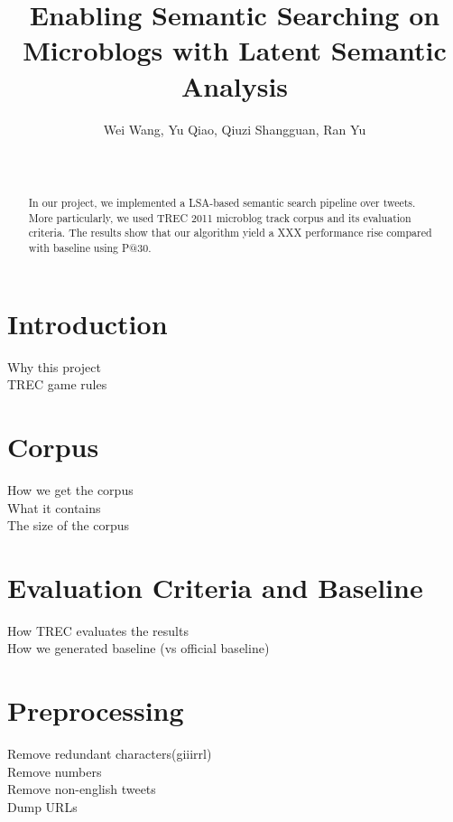 \documentclass{acm_proc_article-sp}
\begin{document}
\title{Enabling Semantic Searching on Microblogs with Latent Semantic Analysis
}


\author{\alignauthor Wei Wang, Yu Qiao, Qiuzi Shangguan, Ran Yu \\
 \\ 
 \\
} 
\maketitle

\begin{abstract}
In our project, we implemented a LSA-based semantic search pipeline over tweets. More particularly, we used TREC 2011 microblog track corpus and its evaluation criteria. The results show that our algorithm yield a XXX performance rise compared with baseline using P@30. 

\end{abstract}

\section{Introduction}
Why this project\\
TREC game rules\\

\section{Corpus}
How we get the corpus\\
What it contains\\
The size of the corpus\\

\section{Evaluation Criteria and Baseline}
How TREC evaluates the results\\
How we generated baseline (vs official baseline)\\

\section{Preprocessing}
Remove redundant characters(giiirrl)\\
Remove numbers\\
Remove non-english tweets\\
Dump URLs\\
\end{document}
